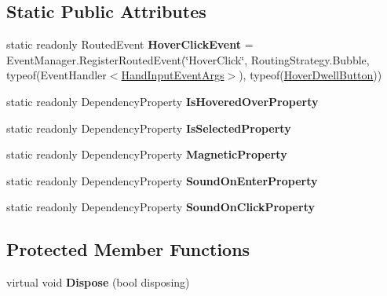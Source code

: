 \subsection*{Static Public Attributes}
\begin{DoxyCompactItemize}
\item 
\hypertarget{class_microsoft_1_1_samples_1_1_kinect_1_1_basic_interactions_1_1_hover_dwell_button_a6528cce3bff41fa1dffae24f34913a34}{static readonly Routed\-Event {\bfseries Hover\-Click\-Event} = Event\-Manager.\-Register\-Routed\-Event(\char`\"{}Hover\-Click\char`\"{}, Routing\-Strategy.\-Bubble, typeof(Event\-Handler$<$\hyperlink{class_microsoft_1_1_samples_1_1_kinect_1_1_basic_interactions_1_1_hand_input_event_args}{Hand\-Input\-Event\-Args}$>$), typeof(\hyperlink{class_microsoft_1_1_samples_1_1_kinect_1_1_basic_interactions_1_1_hover_dwell_button}{Hover\-Dwell\-Button}))}\label{class_microsoft_1_1_samples_1_1_kinect_1_1_basic_interactions_1_1_hover_dwell_button_a6528cce3bff41fa1dffae24f34913a34}

\item 
static readonly Dependency\-Property {\bfseries Is\-Hovered\-Over\-Property}
\item 
static readonly Dependency\-Property {\bfseries Is\-Selected\-Property}
\item 
static readonly Dependency\-Property {\bfseries Magnetic\-Property}
\item 
static readonly Dependency\-Property {\bfseries Sound\-On\-Enter\-Property}
\item 
static readonly Dependency\-Property {\bfseries Sound\-On\-Click\-Property}
\end{DoxyCompactItemize}
\subsection*{Protected Member Functions}
\begin{DoxyCompactItemize}
\item 
\hypertarget{class_microsoft_1_1_samples_1_1_kinect_1_1_basic_interactions_1_1_hover_dwell_button_a669d418cdfbedacd9258b212d9ac4679}{virtual void {\bfseries Dispose} (bool disposing)}\label{class_microsoft_1_1_samples_1_1_kinect_1_1_basic_interactions_1_1_hover_dwell_button_a669d418cdfbedacd9258b212d9ac4679}

\end{DoxyCompactItemize}
